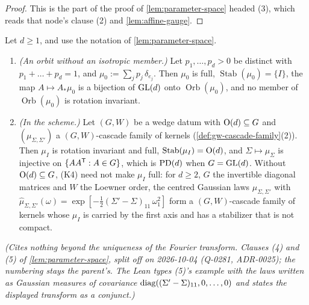 \begin{proof}
\leanok
This is the part of the proof of \ref{lem:parameter-space} headed (3), which reads that node's
clause (2) and \ref{lem:affine-gauge}.
\end{proof}

\begin{lemma}
\label{lem:parameter-space-examples}
\leanok
Let $d \ge 1$, and use the notation of \ref{lem:parameter-space}.
\begin{enumerate}
\item[(4)] \emph{(An orbit without an isotropic member.)} Let $p_1, \dots, p_d > 0$ be distinct with
$p_1 + \dots + p_d = 1$, and $\mu_0 := \sum_jp_j\,\delta_{e_j}$. Then $\mu_0$ is full,
$\operatorname{Stab}(\mu_0) = \{I\}$, the map $A \mapsto A_*\mu_0$ is a bijection of $\mathrm{GL}(d)$ onto
$\operatorname{Orb}(\mu_0)$, and no member of $\operatorname{Orb}(\mu_0)$ is rotation invariant.
\item[(5)] \emph{(In the scheme.)} Let $(G, W)$ be a wedge datum with $\mathrm{O}(d) \subseteq G$ and
$(\mu_{\Sigma,\Sigma'})$ a $(G, W)$-cascade family of kernels (\ref{def:gw-cascade-family}(2)). Then
$\mu_I$ is rotation invariant and full, $\operatorname{Stab}(\mu_I) = \mathrm{O}(d)$, and
$\Sigma \mapsto \mu_\Sigma$ is injective on $\{AA^{\mathsf{T}} : A \in G\}$, which is $\mathrm{PD}(d)$ when
$G = \mathrm{GL}(d)$. Without $\mathrm{O}(d) \subseteq G$, (K4) need not make $\mu_I$ full: for $d \ge 2$, $G$
the invertible diagonal matrices and $W$ the Loewner order, the centred Gaussian laws
$\mu_{\Sigma,\Sigma'}$ with $\widehat\mu_{\Sigma,\Sigma'}(\omega) =
\exp[-\tfrac12(\Sigma' - \Sigma)_{11}\,\omega_1^2]$ form a $(G, W)$-cascade family of kernels whose
$\mu_I$ is carried by the first axis and has a stabilizer that is not compact.
\end{enumerate}
\statusT\quad\emph{(Cites nothing beyond the uniqueness of the Fourier transform. Clauses (4) and
(5) of \ref{lem:parameter-space}, split off on 2026-10-04 (Q-0281, ADR-0025); the numbering stays
the parent's. The Lean types (5)'s example with the laws written as Gaussian measures of covariance
$\operatorname{diag}((\Sigma' - \Sigma)_{11}, 0, \dots, 0)$ and states the displayed transform as a conjunct.)}
\end{lemma}

